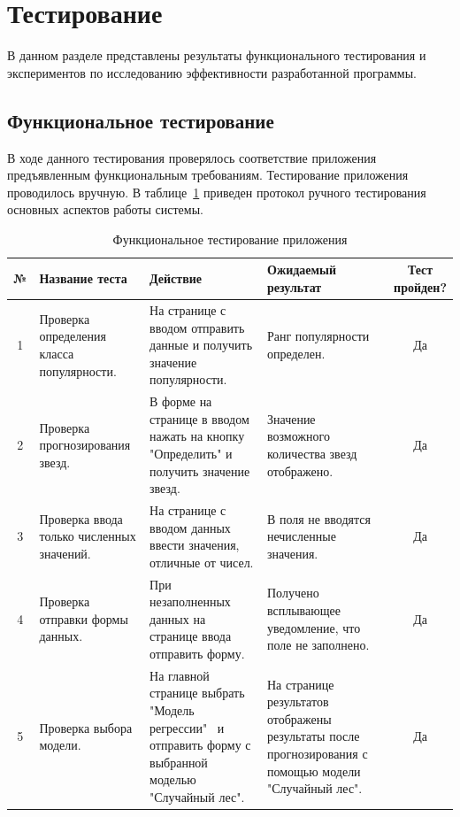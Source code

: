 \newpage
\section{Тестирование}
\label{sec:Testings}
В данном разделе представлены результаты функционального тестирования и экспериментов по исследованию эффективности разработанной программы.
\subsection{Функциональное тестирование}

В ходе данного тестирования проверялось соответствие приложения
предъявленным функциональным требованиям. Тестирование приложения
проводилось вручную. В таблице~\ref{tab:тест} приведен протокол ручного тестирования основных аспектов работы системы.

\begin{table}[H]
    \caption{Функциональное тестирование приложения}
    \fontsize{12pt}{1em}\selectfont
    \vspace{1em}
    \begin{tabularx}{\linewidth}{|c|X|X|X|c|}
       \hline
        \textbf{№} & \textbf{Название теста} & \textbf{Действие} & \textbf{Ожидаемый результат} & \makecell{\textbf{Тест} \\ \textbf{пройден?}} \\ \hline
        1 & Проверка определения класса популярности. & На странице с вводом отправить данные и получить значение популярности. & Ранг популярности определен. & Да \\ \hline
        2 & Проверка прогнозирования звезд. & В форме на странице в вводом нажать на кнопку "Определить" и получить значение звезд. & Значение возможного количества звезд отображено.  & Да \\ \hline
        3 & Проверка ввода только численных значений. & На странице с вводом данных ввести значения, отличные от чисел. & В поля не вводятся нечисленные значения. & Да \\ \hline
        4 & Проверка отправки формы данных. & При незаполненных данных на странице ввода отправить форму. & Получено всплывающее уведомление, что поле не заполнено. & Да \\ \hline
        5 & Проверка выбора модели. & На главной странице выбрать "Модель регрессии" \ и отправить форму с выбранной моделью "Случайный лес". & На странице результатов отображены результаты после прогнозирования с помощью модели "Случайный лес". & Да \\ \hline
        \end{tabularx} 
    \label{tab:тест}
\end{table}
\vspace{2em}

